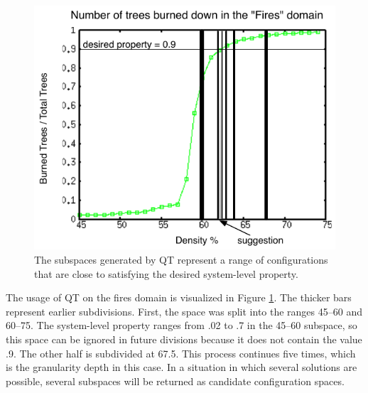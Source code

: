 \begin{figure}[ht]
\centering
\includegraphics[scale=1]{images/QTfires.pdf}
\caption{The subspaces generated by QT represent a range of configurations that are close to satisfying the desired system-level property.}
\label{fig:qtfires}
\end{figure}

The usage of QT on the fires domain is visualized in Figure \ref{fig:qtfires}.
The thicker bars represent earlier subdivisions.
First, the space was split into the ranges 45--60 and 60--75.
The system-level property ranges from .02 to .7 in the 45--60 subspace, so this space can be ignored in future divisions because it does not contain the value .9.
The other half is subdivided at 67.5.
This process continues five times, which is the granularity depth in this case.
In a situation in which several solutions are possible, several subspaces will be returned as candidate configuration spaces.


